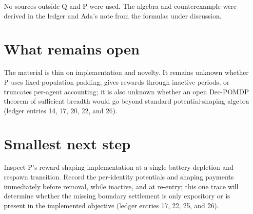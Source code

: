 \documentclass{article}
\begin{document}
No sources outside Q and P were used. The algebra and counterexample were derived in the ledger and Ada's note from the formulas under discussion.

\section{What remains open}

The material is thin on implementation and novelty. It remains unknown whether P uses fixed-population padding, gives rewards through inactive periods, or truncates per-agent accounting; it is also unknown whether an open Dec-POMDP theorem of sufficient breadth would go beyond standard potential-shaping algebra (ledger entries 14, 17, 20, 22, and 26).

\section{Smallest next step}

Inspect P's reward-shaping implementation at a single battery-depletion and respawn transition. Record the per-identity potentials and shaping payments immediately before removal, while inactive, and at re-entry; this one trace will determine whether the missing boundary settlement is only expository or is present in the implemented objective (ledger entries 17, 22, 25, and 26).
\end{document}
